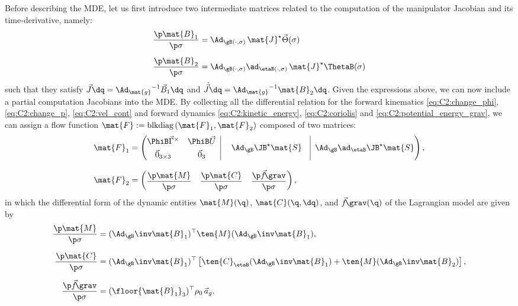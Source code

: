 Before describing the MDE, let us first introduce two intermediate matrices related to the computation of the manipulator Jacobian and its time-derivative, namely:
%
\begin{align}
\frac{\p \mat{B}_1}{\p \sigma} &= \Ad_{\gB(\cdot,\sigma)}\, \mat{J}^\star \vec{\Theta}(\sigma) \\[0.5em]
\frac{\p \mat{B}_2}{\p \sigma} &= \Ad_{\gB(\cdot,\sigma)}\ad_{\etaB(\cdot,\sigma)}\, \mat{J}^\star \ThetaB(\sigma)
\end{align}
%
such that they satisfy $\vec{J} \dq = {\Ad_{\mat{g}}}^{-1} \vec{B}_1 \dq$ and $\,\dot{\!\vec{J}} \dq = {\Ad_{\mat{g}}}^{-1} \mat{B}_2 \dq$.
Given the expressions above, we can now include a partial computation Jacobians into the MDE. By collecting all the differential relation for the forward kinematics \eqref{eq:C2:change_phi}, \eqref{eq:C2:change_p}, \eqref{eq:C2:vel_cont} and forward dynamics \eqref{eq:C2:kinetic_energy}, \eqref{eq:C2:coriolis} and
\eqref{eq:C2:potential_energy_grav}, we can assign a flow function
$\mat{F}:= \text{blkdiag}\left(\mat{F}_1,\mat{F}_2 \right)$
composed of two matrices:
%
\begin{align}
\mat{F}_1 & = \begin{pmatrix}
\begin{matrix} \PhiB \vec{\Gamma}^\times & \PhiB \vec{U} \\[0.35em] \vec{0}_{3\times3} & \vec{0}_3 \end{matrix}
\;\; \vrule\; & \Ad_{\gB} \JB^\star\mat{S} &\vrule\;\; \Ad_{\gB} \ad_{\etaB} \JB^\star \mat{S}
\end{pmatrix}, \\[0.75em]
\mat{F}_2 & = \begin{pmatrix}
\dfrac{\p \mat{M}}{\p \sigma} & \dfrac{\p \mat{C}}{\p \sigma} & \dfrac{\p \vec{f}\!\grav}{\p \sigma} \end{pmatrix},
\end{align}
in which the differential form of the dynamic entities $\mat{M}(\q)$, $\mat{C}(\q,\dq)$, and $\vec{f}\!\grav(\q)$ of the Lagrangian model are given by
%
\begin{align}
\dfrac{\p \mat{M}}{\p \sigma} & = (\Ad_{\gB}\inv \mat{B}_1)^\top \ten{M} (\Ad_{\gB}\inv \mat{B}_1), \\[0.6em]
\dfrac{\p \mat{C}}{\p \sigma} & = (\Ad_{\gB}\inv \mat{B}_1)^\top \left[\ten{C}_\etaB (\Ad_{\gB}\inv \mat{B}_1) + \ten{M} (\Ad_{\gB}\inv \mat{B}_2) \right], \\[0.6em]
\dfrac{\p \vec{f}\!\grav}{\p \sigma} & = (\floor{\mat{B}_{1}}_3)^\top \rho_0\, \vec{a}_g,
\end{align}
